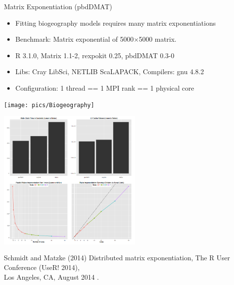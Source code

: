 \begin{frame}
  \begin{block}{Matrix Exponentiation (pbdDMAT)}
    \begin{minipage}{5cm}
      \begin{itemize}\tiny
      \item Fitting biogeography models requires many matrix exponentiations
      \item Benchmark: Matrix exponential of 5000$\times$5000 matrix.
      \item R 3.1.0, Matrix 1.1-2, rexpokit 0.25, pbdDMAT 0.3-0
      \item Libs: Cray LibSci, NETLIB ScaLAPACK, Compilers: gnu 4.8.2
      \item Configuration: 1 thread == 1 MPI rank == 1 physical core
      \end{itemize}
      \vspace{-4ex}
      \begin{center}
        \texttt{[image: pics/Biogeography]}
      \end{center}
    \end{minipage}
    \begin{minipage}{6.9cm}
      \includegraphics[trim=1mm 1mm 1mm 1mm,clip=true,height=7cm]{pics/MatExp}
    \end{minipage}
  \end{block}
  \begin{raggedright}\tiny
    Schmidt and Matzke (2014) Distributed matrix exponentiation, The R
    User Conference (UseR! 2014), \\[-2ex] Los Angeles, CA, August 2014 .
  \end{raggedright}
\end{frame}








%


